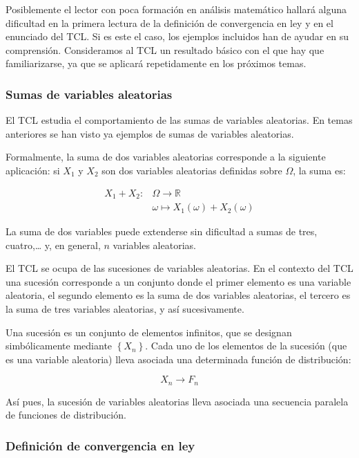 \documentclass[
]{article}
\begin{document}
Posiblemente el lector con poca formación en análisis matemático hallará alguna dificultad en la primera lectura de la definición de convergencia en ley y en el enunciado del TCL. Si es este el caso, los ejemplos incluidos han de ayudar en su comprensión. Consideramos al TCL un resultado básico con el que hay que familiarizarse, ya que se aplicará repetidamente en los próximos temas.

\subsubsection{Sumas de variables aleatorias}\label{sumas-de-variables-aleatorias}

El TCL estudia el comportamiento de las sumas de variables aleatorias. En temas anteriores se han visto ya ejemplos de sumas de variables aleatorias.

Formalmente, la suma de dos variables aleatorias corresponde a la siguiente aplicación: si \(X_{1}\) y \(X_{2}\) son dos variables aleatorias definidas sobre \(\Omega\), la suma es:

\[
\begin{aligned}
X_{1}+X_{2}: & \Omega \rightarrow \mathbb{R} \\
& \omega \mapsto X_{1}(\omega)+X_{2}(\omega)
\end{aligned}
\]

La suma de dos variables puede extenderse sin dificultad a sumas de tres, cuatro,\ldots{} y, en general, \(n\) variables aleatorias.

El TCL se ocupa de las sucesiones de variables aleatorias. En el contexto del TCL una sucesión corresponde a un conjunto donde el primer elemento es una variable aleatoria, el segundo elemento es la suma de dos variables aleatorias, el tercero es la suma de tres variables aleatorias, y así sucesivamente.

Una sucesión es un conjunto de elementos infinitos, que se designan simbólicamente mediante \(\left\{X_{n}\right\}\).
Cada uno de los elementos de la sucesión (que es una variable aleatoria) lleva asociada una determinada función de distribución:

\[
X_{n} \rightarrow F_{n}
\]

Así pues, la sucesión de variables aleatorias lleva asociada una secuencia paralela de funciones de distribución.

\subsubsection{Definición de convergencia en ley}\label{definiciuxf3n-de-convergencia-en-ley}
\end{document}
